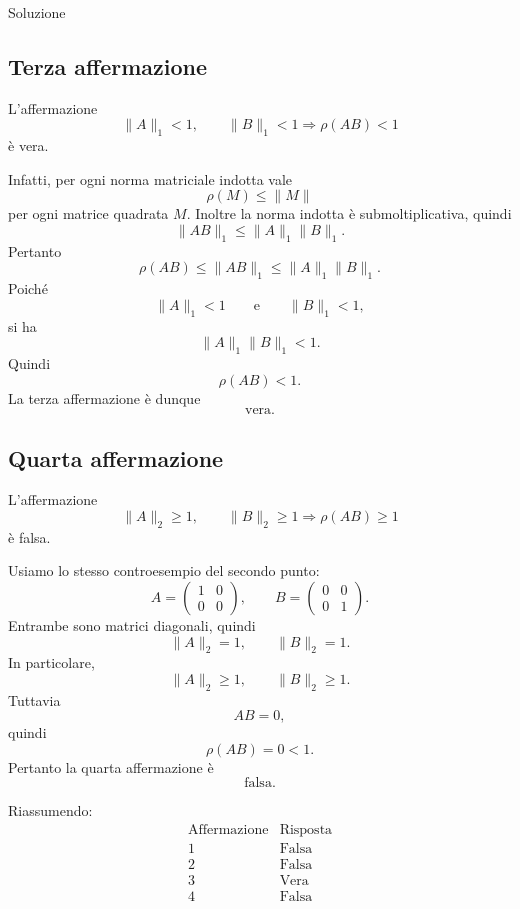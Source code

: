 \documentclass[a4paper]{article}
\begin{document}
\begin{snippetsolution}{Soluzione}
    \subsection*{Terza affermazione}

    L'affermazione
    \[
        \|A\|_1<1,\qquad \|B\|_1<1
        \Longrightarrow
        \rho(AB)<1
    \]
    è vera.

    Infatti, per ogni norma matriciale indotta vale
    \[
        \rho(M)\leq \|M\|
    \]
    per ogni matrice quadrata \(M\). Inoltre la norma indotta è submoltiplicativa, quindi
    \[
        \|AB\|_1\leq \|A\|_1\|B\|_1.
    \]
    Pertanto
    \[
        \rho(AB)
        \leq
        \|AB\|_1
        \leq
        \|A\|_1\|B\|_1.
    \]
    Poiché
    \[
        \|A\|_1<1
        \qquad
        \text{e}
        \qquad
        \|B\|_1<1,
    \]
    si ha
    \[
        \|A\|_1\|B\|_1<1.
    \]
    Quindi
    \[
        \rho(AB)<1.
    \]
    La terza affermazione è dunque
    \[
        \boxed{\text{vera}.}
    \]

    \subsection*{Quarta affermazione}

    L'affermazione
    \[
        \|A\|_2\geq 1,
        \qquad
        \|B\|_2\geq 1
        \Longrightarrow
        \rho(AB)\geq 1
    \]
    è falsa.

    Usiamo lo stesso controesempio del secondo punto:
    \[
        A=
        \begin{pmatrix}
            1 & 0\\
            0 & 0
        \end{pmatrix},
        \qquad
        B=
        \begin{pmatrix}
            0 & 0\\
            0 & 1
        \end{pmatrix}.
    \]
    Entrambe sono matrici diagonali, quindi
    \[
        \|A\|_2=1,
        \qquad
        \|B\|_2=1.
    \]
    In particolare,
    \[
        \|A\|_2\geq 1,
        \qquad
        \|B\|_2\geq 1.
    \]
    Tuttavia
    \[
        AB=0,
    \]
    quindi
    \[
        \rho(AB)=0<1.
    \]
    Pertanto la quarta affermazione è
    \[
        \boxed{\text{falsa}.}
    \]

    Riassumendo:
    \[
        \boxed{
            \begin{array}{c|c}
                \text{Affermazione} & \text{Risposta}\\
                \hline
                1 & \text{Falsa}\\
                2 & \text{Falsa}\\
                3 & \text{Vera}\\
                4 & \text{Falsa}
            \end{array}
        }
    \]
\end{snippetsolution}
\end{document}
